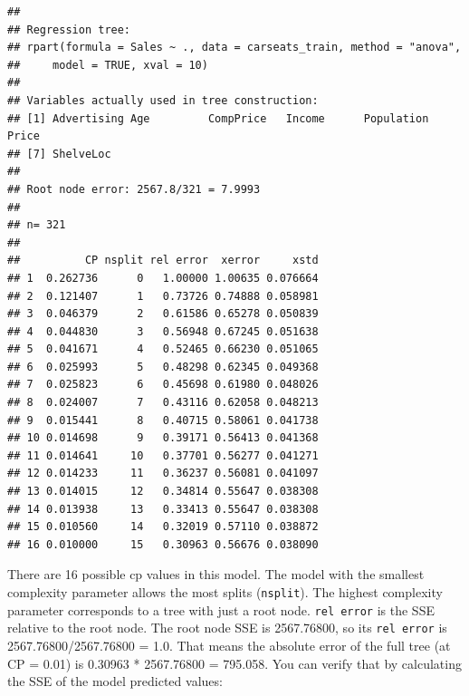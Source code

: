 \documentclass[
]{book}
\newenvironment{Shaded}{\begin{snugshade}}{\end{snugshade}}
\newcommand{\DataTypeTok}[1]{\textcolor[rgb]{0.13,0.29,0.53}{#1}}
\newcommand{\DecValTok}[1]{\textcolor[rgb]{0.00,0.00,0.81}{#1}}
\newcommand{\KeywordTok}[1]{\textcolor[rgb]{0.13,0.29,0.53}{\textbf{#1}}}
\newcommand{\NormalTok}[1]{#1}
\newcommand{\OperatorTok}[1]{\textcolor[rgb]{0.81,0.36,0.00}{\textbf{#1}}}
\newcommand{\StringTok}[1]{\textcolor[rgb]{0.31,0.60,0.02}{#1}}
\begin{document}
\begin{verbatim}
## 
## Regression tree:
## rpart(formula = Sales ~ ., data = carseats_train, method = "anova", 
##     model = TRUE, xval = 10)
## 
## Variables actually used in tree construction:
## [1] Advertising Age         CompPrice   Income      Population  Price      
## [7] ShelveLoc  
## 
## Root node error: 2567.8/321 = 7.9993
## 
## n= 321 
## 
##          CP nsplit rel error  xerror     xstd
## 1  0.262736      0   1.00000 1.00635 0.076664
## 2  0.121407      1   0.73726 0.74888 0.058981
## 3  0.046379      2   0.61586 0.65278 0.050839
## 4  0.044830      3   0.56948 0.67245 0.051638
## 5  0.041671      4   0.52465 0.66230 0.051065
## 6  0.025993      5   0.48298 0.62345 0.049368
## 7  0.025823      6   0.45698 0.61980 0.048026
## 8  0.024007      7   0.43116 0.62058 0.048213
## 9  0.015441      8   0.40715 0.58061 0.041738
## 10 0.014698      9   0.39171 0.56413 0.041368
## 11 0.014641     10   0.37701 0.56277 0.041271
## 12 0.014233     11   0.36237 0.56081 0.041097
## 13 0.014015     12   0.34814 0.55647 0.038308
## 14 0.013938     13   0.33413 0.55647 0.038308
## 15 0.010560     14   0.32019 0.57110 0.038872
## 16 0.010000     15   0.30963 0.56676 0.038090
\end{verbatim}

There are 16 possible cp values in this model. The model with the smallest complexity parameter allows the most splits (\texttt{nsplit}). The highest complexity parameter corresponds to a tree with just a root node. \texttt{rel\ error} is the SSE relative to the root node. The root node SSE is 2567.76800, so its \texttt{rel\ error} is 2567.76800/2567.76800 = 1.0. That means the absolute error of the full tree (at CP = 0.01) is 0.30963 * 2567.76800 = 795.058. You can verify that by calculating the SSE of the model predicted values:

\begin{Shaded}
\end{Shaded}
\end{document}
